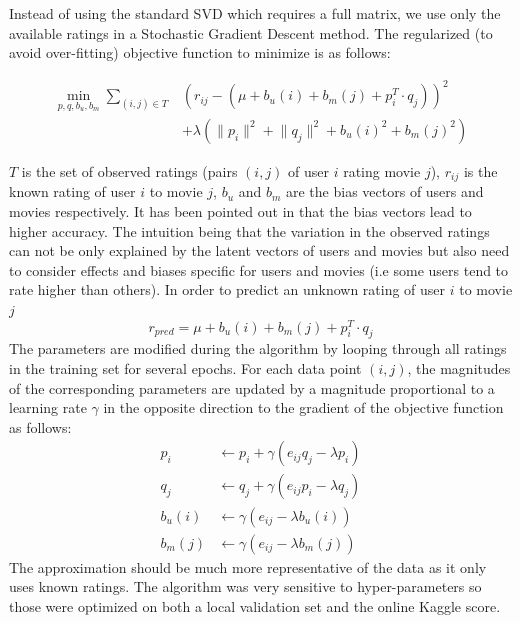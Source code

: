 \documentclass[10pt,conference,compsocconf]{IEEEtran}
\begin{document}
Instead of using the standard SVD which requires a full matrix, we use only the available ratings in a Stochastic Gradient Descent method. The regularized (to avoid over-fitting) objective function to minimize is as follows:

\begin{equation}
\begin{split}
\min_{p,q,b_u,b_m} \sum_{(i,j) \in T} &(r_{ij} - (\mu + b_u(i) + b_m(j) + p_i^T \cdot q_j))^2 \\ &+ \lambda(\lVert p_i \rVert^2 + \lVert q_j \rVert^2 + b_u(i)^2 + b_m(j)^2) 
\end{split}
\end{equation}

$T$ is the set of observed ratings (pairs $(i,j)$ of user $i$ rating movie $j$), $r_{ij}$ is the known rating of user $i$ to movie $j$, $b_u$ and $b_m$ are the bias vectors of users and movies respectively. It has been pointed out in \cite{Koren09matrixfactorization} that the bias vectors lead to higher accuracy. The intuition being that the variation in the observed ratings can not be only explained by the latent vectors of users and movies but also need to consider effects and biases specific for users and movies (i.e some users tend to rate higher than others). In order to predict an unknown rating of user $i$ to movie $j$
\begin{equation}
	r_{pred} = \mu + b_u(i) + b_m(j) + p_i^T\cdot q_j
\end{equation}
The parameters are modified during the algorithm by looping through all ratings in the training set for several epochs. For each data point $(i,j)$, the magnitudes of the corresponding parameters are updated by a magnitude proportional to a learning rate $\gamma$ in the opposite direction to the gradient of the objective function as follows:
\begin{equation}
\begin{split}
	p_i &\leftarrow p_i + \gamma(e_{ij}q_j - \lambda p_i) \\
	q_j &\leftarrow q_j + \gamma(e_{ij}p_i - \lambda q_j) \\
	b_u(i) &\leftarrow \gamma(e_{ij} - \lambda b_u(i)) \\
	b_m(j) &\leftarrow \gamma(e_{ij} - \lambda b_m(j)) 
\end{split}
\end{equation}
The approximation should be much more representative of the data as it only uses known ratings. The algorithm was very sensitive to hyper-parameters so those were optimized on both a local validation set and the online Kaggle score.
\end{document}
